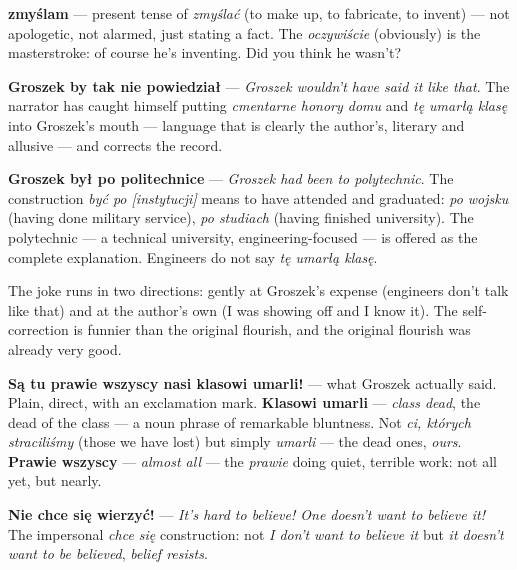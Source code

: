 \textbf{zmyślam} --- present tense of \textit{zmyślać} (to make up,
to fabricate, to invent) --- not apologetic, not alarmed, just stating
a fact. The \textit{oczywiście} (obviously) is the masterstroke: of
course he's inventing. Did you think he wasn't?

\textbf{Groszek by tak nie powiedział} --- \textit{Groszek wouldn't
have said it like that}. The narrator has caught himself putting
\textit{cmentarne honory domu} and \textit{tę umarłą klasę} into
Groszek's mouth --- language that is clearly the author's, literary
and allusive --- and corrects the record.

\textbf{Groszek był po politechnice} --- \textit{Groszek had been to
polytechnic}. The construction \textit{być po [instytucji]} means to
have attended and graduated: \textit{po wojsku} (having done military
service), \textit{po studiach} (having finished university). The
polytechnic --- a technical university, engineering-focused --- is
offered as the complete explanation. Engineers do not say \textit{tę
umarłą klasę}.

The joke runs in two directions: gently at Groszek's expense (engineers
don't talk like that) and at the author's own (I was showing off and I
know it). The self-correction is funnier than the original flourish,
and the original flourish was already very good.



\textbf{Są tu prawie wszyscy nasi klasowi umarli!} --- what Groszek
actually said. Plain, direct, with an exclamation mark.
\textbf{Klasowi umarli} --- \textit{class dead}, the dead of the class
--- a noun phrase of remarkable bluntness. Not \textit{ci, których
straciliśmy} (those we have lost) but simply \textit{umarli} --- the
dead ones, \textit{ours}. \textbf{Prawie wszyscy} --- \textit{almost
all} --- the \textit{prawie} doing quiet, terrible work: not all yet,
but nearly.

\textbf{Nie chce się wierzyć!} --- \textit{It's hard to believe! One
doesn't want to believe it!} The impersonal \textit{chce się}
construction: not \textit{I don't want to believe it} but \textit{it
doesn't want to be believed}, \textit{belief resists}.


